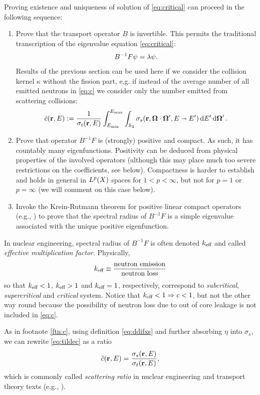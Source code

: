 Proving existence and uniqueness of solution of \eqref{eq:critical} can proceed in the following sequence:
\begin{enumerate}
	\item
		Prove that the transport operator $B$ is invertible. This permits the traditional transcription of the  eigenvalue
		equation \eqref{eq:critical}:
		$$
		B^{-1}F\psi = \lambda\psi.
		$$
		Results of the previous section can be used here if we consider the collision kernel $\kappa$ without the fission
		part, e.g. if instead of the average number of all emitted neutrons in \eqref{eq:c} we consider only the number
		emitted from scattering collisions: 
		\begin{equation}\label{eq:tildec}
		\tilde c(\mathbf{r},E) := \frac{1}{\sigma_t(\mathbf{r},E)}\int_{E_{\text{min}}}^{E_{\text{max}}}\int_{\mathcal{S}_2}
		\sigma_s(\mathbf{r},\mathbf{\Omega}\cdot\mathbf{\Omega}', E\shortrightarrow E')\,\text{d}E'\,\text{d}\mathbf{\Omega}'\,.
	    \end{equation}
	\item
		Prove that operator $B^{-1}F$ is (strongly) positive and compact. As such, it has countably many eigenfunctions. 
		Positivity can be deduced from physical properties of the involved operators (although this may place much too severe
		restrictions on the coefficients, see below). Compactness is harder to establish and holds in general in $L^{p}(X)$
		spaces for $1 < p < \infty$, but not for $p = 1$ or $p = \infty$ (we will comment on this case below).
	\item
		Invoke the Krein-Rutmann theorem for positive linear compact operators (e.g., \cite[Thm. 5.4.33]{DrabekNFA}) to prove
		that the spectral radius of $B^{-1}F$ is a simple eigenvalue associated with the unique positive eigenfunction.
\end{enumerate}
\begin{remark}\label{rem:keff}
In nuclear engineering, spectral radius of $B^{-1}F$ is often denoted $k_{\text{eff}}$
and called \textit{effective multiplication factor}. Physically,
$$
k_{\text{eff}} \equiv \frac{\mbox{neutron emission}}{\mbox{neutron loss}}
$$
so that 
$k_{\text{eff}} < 1$, $k_{\text{eff}} > 1$ and $k_{\text{eff}} = 1$, respectively, correspond to \textit{subcritical},
\textit{supercritical} and \textit{critical} system. Notice that $k_{\text{eff}} < 1 \Rightarrow c < 1$, but not the other way
round because the possibility of neutron loss due to out of core leakage is not included in \eqref{eq:c}. 
\end{remark}
\begin{remark}
As in footnote \ref{ftn:c}, using definition \eqref{eq:ddifxs} and further absorbing $\eta$ into
$\sigma_s$, we can rewrite \eqref{eq:tildec} as a ratio 
\begin{equation}\label{eq:scattering_ratio}
\tilde{c}(\mathbf{r},E) = \frac{\sigma_s(\mathbf{r},E)}{\sigma_t(\mathbf{r},E)},
\end{equation}
which is commonly called \textit{scattering ratio} in nuclear engineering and transport theory texts (e.g.,
\cite{Adams}).
\end{remark}

